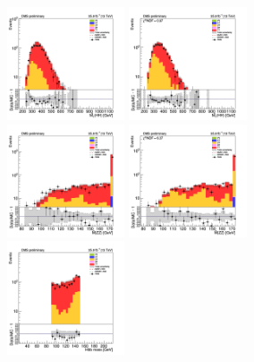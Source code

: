 \begin{figure}[tbp]
\begin{center}
    \includegraphics[width=0.31\textwidth]{figures/ee_300_april18/ee_300_good_SR_bdt_sideBand_april18/hhMt_ee_SR_prefit_plot_apr18.png}
    \includegraphics[width=0.31\textwidth]{figures/ee_300_april18/ee_300_good_SR_bdt_sideBand_april18/hhMt_ee_SR_FullPostfit_plot_apr18.png}\\
    \includegraphics[width=0.31\textwidth]{figures/ee_300_april18/ee_300_good_SR_bdt_sideBand_april18/hmass0_ee_SR_prefit_plot_apr18.png}
    \includegraphics[width=0.31\textwidth]{figures/ee_300_april18/ee_300_good_SR_bdt_sideBand_april18/hmass0_ee_SR_FullPostfit_plot_apr18.png}\\
    \includegraphics[width=0.31\textwidth]{figures/ee_300_april18/ee_300_good_SR_bdt_sideBand_april18/hmass1_ee_SR_prefit_plot_apr18.png}

\end{center}
\end{figure}
